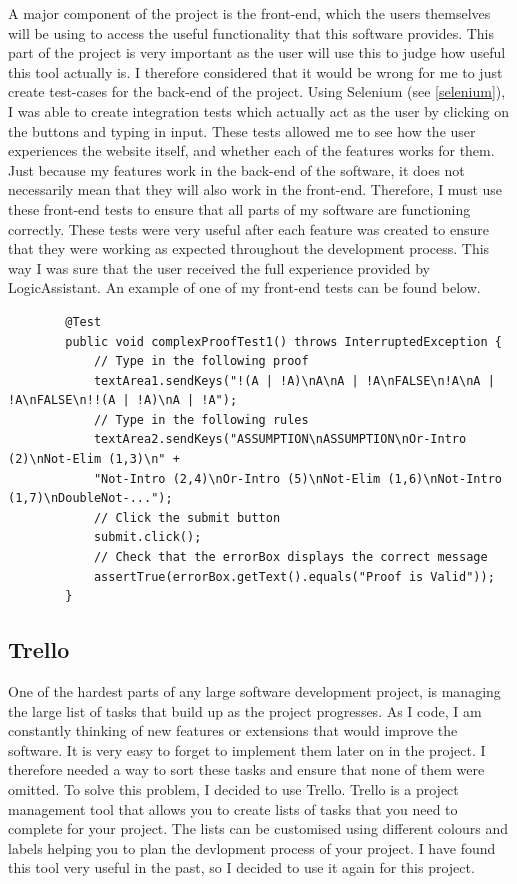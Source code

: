 A major component of the project is the front-end, which the users themselves will be using to access the useful functionality that this software provides. This part of the project is very important as the user will use this to judge how useful this tool actually is. I therefore considered that it would be wrong for me to just create test-cases for the back-end of the project. Using Selenium (see \ref{selenium}), I was able to create integration tests which actually act as the user by clicking on the buttons and typing in input. These tests allowed me to see how the user experiences the website itself, and whether each of the features works for them. Just because my features work in the back-end of the software, it does not necessarily mean that they will also work in the front-end. Therefore, I must use these front-end tests to ensure that all parts of my software are functioning correctly. These tests were very useful after each feature was created to ensure that they were working as expected throughout the development process. This way I was sure that the user received the full experience provided by LogicAssistant. An example of one of my front-end tests can be found below.

\begin{lstlisting}
		@Test
		public void complexProofTest1() throws InterruptedException {
			// Type in the following proof
			textArea1.sendKeys("!(A | !A)\nA\nA | !A\nFALSE\n!A\nA | !A\nFALSE\n!!(A | !A)\nA | !A");
			// Type in the following rules
			textArea2.sendKeys("ASSUMPTION\nASSUMPTION\nOr-Intro (2)\nNot-Elim (1,3)\n" + 
			"Not-Intro (2,4)\nOr-Intro (5)\nNot-Elim (1,6)\nNot-Intro (1,7)\nDoubleNot-...");
			// Click the submit button
			submit.click();
			// Check that the errorBox displays the correct message
			assertTrue(errorBox.getText().equals("Proof is Valid"));
		}
\end{lstlisting}

\subsection{Trello \label{trello}}

One of the hardest parts of any large software development project, is managing the large list of tasks that build up as the project progresses. As I code, I am constantly thinking of new features or extensions that would improve the software. It is very easy to forget to implement them later on in the project. I therefore needed a way to sort these tasks and ensure that none of them were omitted. To solve this problem, I decided to use Trello. Trello is a project management tool that allows you to create lists of tasks that you need to complete for your project. The lists can be customised using different colours and labels helping you to plan the devlopment process of your project. I have found this tool very useful in the past, so I decided to use it again for this project.


